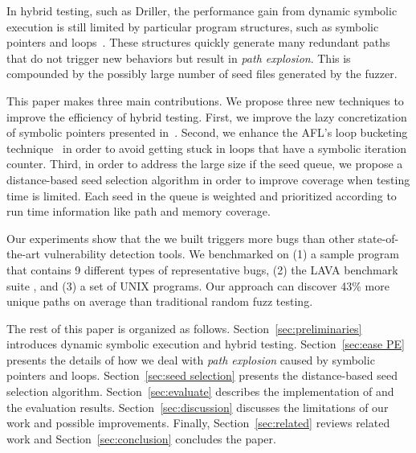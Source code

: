In hybrid testing, such as Driller, the performance gain from dynamic
symbolic execution is still limited by particular program
structures, such as symbolic pointers and loops~\cite{schwartz2010all,
Boonstoppel:RAP, cadar2011symbolic, baldoni2016survey}. These structures
quickly generate many redundant paths that do not trigger new behaviors
but result in \textit{path explosion}. This is compounded by the possibly
large number of seed files generated by the fuzzer.

This paper makes three main contributions. We propose three new
techniques to improve the efficiency of hybrid testing. First, we
improve the lazy concretization of symbolic pointers presented
in~\cite{chipounov2011s2e}. Second, we enhance the AFL's loop bucketing
technique~\cite{online:afl} in order to avoid getting stuck in loops
that have a symbolic iteration counter. Third, in order to address the
large size if the seed queue, we propose a distance-based seed
selection algorithm in order to improve coverage when testing time is
limited. Each seed in the queue is weighted and prioritized according
to run time information like path and memory coverage.

Our experiments show that the \prototype we built triggers more bugs
than other state-of-the-art vulnerability detection tools. We
benchmarked \prototype on (1) a sample program that contains 9
different types of representative bugs, (2) the LAVA benchmark suite
\cite{dolan2016lava}, and (3) a set of UNIX programs. Our approach can
discover 43\% more unique paths on average than traditional random fuzz
testing.

The rest of this paper is organized as follows.
Section~\ref{sec:preliminaries} introduces dynamic symbolic execution
and hybrid testing. Section~\ref{sec:ease PE} presents the details of
how we deal with \textit{path explosion} caused by symbolic pointers
and loops. Section~\ref{sec:seed selection} presents the distance-based
seed selection algorithm. Section~\ref{sec:evaluate} describes the
implementation of \prototype and the evaluation results.
Section~\ref{sec:discussion} discusses the limitations of our work and
possible improvements. Finally, Section~\ref{sec:related} reviews
related work and Section~\ref{sec:conclusion} concludes the paper.
